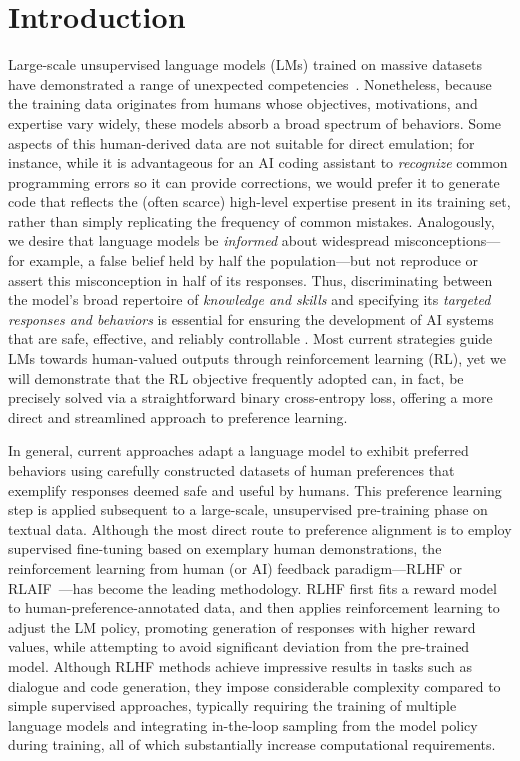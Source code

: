 \section{Introduction}
Large-scale unsupervised language models (LMs) trained on massive datasets have demonstrated a range of unexpected competencies~\citep{chowdhery2022palm, brown2020language, touvron2023llama,bubeck2023sparks}. Nonetheless, because the training data originates from humans whose objectives, motivations, and expertise vary widely, these models absorb a broad spectrum of behaviors. Some aspects of this human-derived data are not suitable for direct emulation; for instance, while it is advantageous for an AI coding assistant to \textit{recognize} common programming errors so it can provide corrections, we would prefer it to generate code that reflects the (often scarce) high-level expertise present in its training set, rather than simply replicating the frequency of common mistakes. Analogously, we desire that language models be \textit{informed} about widespread misconceptions—for example, a false belief held by half the population—but not reproduce or assert this misconception in half of its responses. Thus, discriminating between the model’s broad repertoire of \emph{knowledge and skills} and specifying its \emph{targeted responses and behaviors} is essential for ensuring the development of AI systems that are safe, effective, and reliably controllable \citep{ouyang2022training}. Most current strategies guide LMs towards human-valued outputs through reinforcement learning (RL), yet we will demonstrate that the RL objective frequently adopted can, in fact, be precisely solved via a straightforward binary cross-entropy loss, offering a more direct and streamlined approach to preference learning.

In general, current approaches adapt a language model to exhibit preferred behaviors using carefully constructed datasets of human preferences that exemplify responses deemed safe and useful by humans. This preference learning step is applied subsequent to a large-scale, unsupervised pre-training phase on textual data. Although the most direct route to preference alignment is to employ supervised fine-tuning based on exemplary human demonstrations, the reinforcement learning from human (or AI) feedback paradigm—RLHF or RLAIF~\citep{christiano2017deep,bai2022constitutional}—has become the leading methodology. RLHF first fits a reward model to human-preference-annotated data, and then applies reinforcement learning to adjust the LM policy, promoting generation of responses with higher reward values, while attempting to avoid significant deviation from the pre-trained model. Although RLHF methods achieve impressive results in tasks such as dialogue and code generation, they impose considerable complexity compared to simple supervised approaches, typically requiring the training of multiple language models and integrating in-the-loop sampling from the model policy during training, all of which substantially increase computational requirements.


